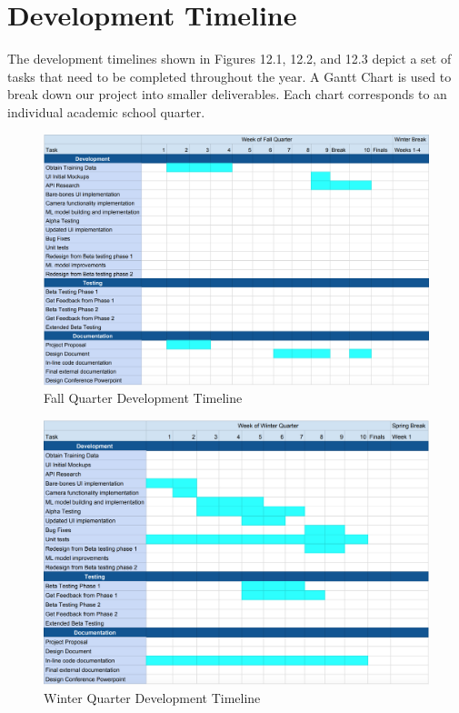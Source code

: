 \chapter{Development Timeline}

The development timelines shown in Figures 12.1, 12.2, and 12.3 depict a set of tasks that need to be completed throughout the year.  A Gantt Chart is used to break down our project into smaller deliverables.  Each chart corresponds to an individual academic school quarter.

\begin{figure}[!h]
	\centering
	\includegraphics[width=1\textwidth]{timeline1}
	\caption{Fall Quarter Development Timeline}
	\label{fig:timeline1}
\end{figure}

\begin{figure}[!h]
	\centering
	\includegraphics[width=1\textwidth]{timeline2}
	\caption{Winter Quarter Development Timeline}
	\label{fig:timeline2}
\end{figure}

